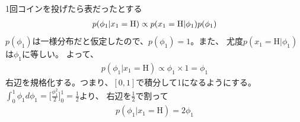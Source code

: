 \documentclass[aspectratio=169,unicode,dvipdfmx,14pt]{beamer}
\begin{document}
\begin{frame}{1回コインを投げたら表だったとする}
\vspace{-.3in}
\begin{align}
p(\phi_1 | x_1 = \mbox{H}) \propto p(x_1 = \mbox{H} | \phi_1) p(\phi_1)
\notag
\end{align}
$p(\phi_1)$は一様分布だと仮定したので、$p(\phi_1)=1$。また、
尤度$p(x_1 = \mbox{H} | \phi_1)$は$\phi_1$に等しい。
よって、
\begin{align}
p(\phi_1 | x_1 = \mbox{H}) \propto \phi_1 \times 1 = \phi_1
\end{align}
右辺を規格化する。つまり、$[0,1]$で積分して1になるようにする。
$\int_0^1 \phi_1 d\phi_1 = \Big[ \frac{\phi_1^2}{2} \Big]_0^1 = \frac{1}{2}$より、
右辺を$\frac{1}{2}$で割って
\begin{align}
p(\phi_1 | x_1 = \mbox{H}) = 2\phi_1
\end{align}
\end{frame}
\end{document}
